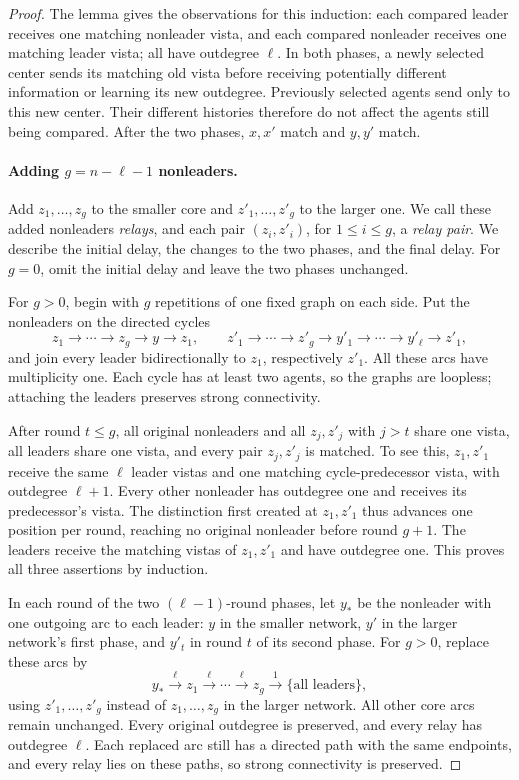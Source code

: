 \documentclass[11pt]{article}
\begin{document}
\begin{proof}
The lemma gives the observations for this induction: each compared leader
receives one matching nonleader vista, and each compared nonleader receives
one matching leader vista;
all have outdegree \(\ell\). In both phases, a newly selected center
sends its matching old vista before receiving potentially different
information or learning its new outdegree. Previously selected agents
send only to this new center. Their different histories therefore do not
affect the agents still being compared.
After the two phases, \(x,x'\) match and \(y,y'\) match.

\paragraph{Adding \(g=n-\ell-1\) nonleaders.}
Add \(z_1,\ldots,z_g\) to the smaller core and
\(z'_1,\ldots,z'_g\) to the larger one.
We call these added nonleaders \emph{relays}, and each pair
\((z_i,z'_i)\), for \(1\leq i\leq g\), a \emph{relay pair}.
We describe the initial delay, the changes to the two phases, and the
final delay. For \(g=0\), omit the initial delay and leave the two phases
unchanged.

For \(g>0\), begin with \(g\) repetitions of one fixed graph on each side.
Put the nonleaders on the directed cycles
\[
 z_1\to\cdots\to z_g\to y\to z_1,
 \qquad
 z'_1\to\cdots\to z'_g\to y'_1\to\cdots\to y'_\ell\to z'_1,
\]
and join every leader bidirectionally to \(z_1\), respectively \(z'_1\).
All these arcs have multiplicity one. Each cycle has at least two agents,
so the graphs are loopless; attaching the leaders preserves strong
connectivity.

After round \(t\le g\), all original nonleaders and all
\(z_j,z'_j\) with \(j>t\) share one vista, all leaders share one vista,
and every pair \(z_j,z'_j\) is matched.
To see this, \(z_1,z'_1\) receive the same \(\ell\) leader vistas and one
matching cycle-predecessor vista, with outdegree \(\ell+1\).
Every other nonleader has outdegree one and receives its predecessor's
vista. The distinction first created at \(z_1,z'_1\) thus advances one
position per round, reaching no original nonleader before round \(g+1\).
The leaders receive the matching vistas of \(z_1,z'_1\) and have
outdegree one. This proves all three assertions by induction.

In each round of the two \((\ell-1)\)-round phases, let \(y_*\) be the nonleader
with one outgoing arc to each leader: \(y\) in the smaller
network, \(y'\) in the larger network's first phase, and
\(y'_t\) in round \(t\) of its second phase.
For \(g>0\), replace these arcs by
\[
 y_*\xrightarrow{\ell}z_1\xrightarrow{\ell}\cdots
 \xrightarrow{\ell}z_g\xrightarrow{1}\{\text{all leaders}\},
\]
using \(z'_1,\ldots,z'_g\) instead of \(z_1,\ldots,z_g\)
in the larger network. All other core arcs remain
unchanged. Every original outdegree is preserved, and every relay has
outdegree \(\ell\). Each replaced arc still has a directed path with the
same endpoints, and every relay lies on these paths, so strong
connectivity is preserved.


\end{proof}
\end{document}
